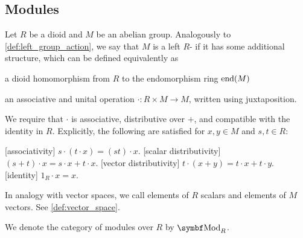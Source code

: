 \subsection{Modules}\label{subsec:modules}

\begin{definition}\label{def:left_module}
  Let \( R \) be a dioid and \( M \) be an abelian group. Analogously to \cref{def:left_group_action}, we say that \( M \) is a left \( R \)- if it has some additional structure, which can be defined equivalently as
  \begin{defenum}
     a dioid homomorphism from \( R \) to the endomorphism ring \( \operatorname{end}(M) \)

    \cite[374]{Knapp2016BAlg} an associative  and unital operation \( \cdot: R \times M \to M \), written using juxtaposition.

    We require that \( \cdot \) is associative, distributive over \( + \), and compatible with the identity in \( R \). Explicitly, the following are satisfied for \( x, y \in M \) and \( s, t \in R \):
    \begin{description}
      [associativity] \( s \cdot (t \cdot x) = (s t) \cdot x \).
      [scalar distributivity] \( (s + t) \cdot x = s \cdot x + t \cdot x \).
      [vector distributivity] \( t \cdot (x + y) = t \cdot x + t \cdot y \).
      [identity] \( 1_R \cdot x = x \).
    \end{description}
  \end{defenum}

  In analogy with vector spaces, we call elements of \( R \) scalars and elements of \( M \) vectors. See \cref{def:vector_space}.

  We denote the category of modules over \( R \) by \( \Cat{Mod}_R \).
\end{definition}
